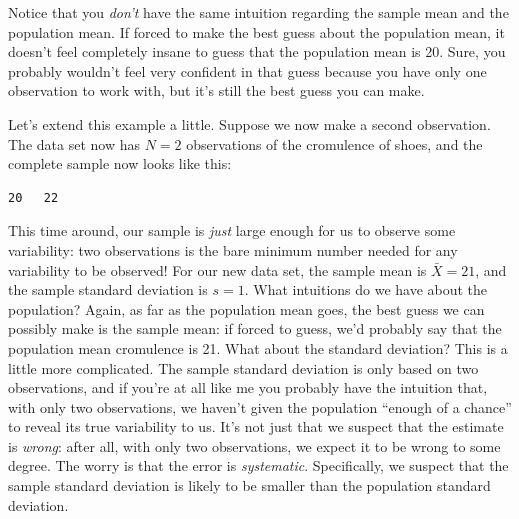 \documentclass[
]{book}
\theoremstyle{definition}
\theoremstyle{definition}
\theoremstyle{definition}
\theoremstyle{definition}
\theoremstyle{remark}
\begin{document}
Notice that you \emph{don't} have the same intuition regarding the sample mean and the population mean. If forced to make the best guess about the population mean, it doesn't feel completely insane to guess that the population mean is 20. Sure, you probably wouldn't feel very confident in that guess because you have only one observation to work with, but it's still the best guess you can make.

Let's extend this example a little. Suppose we now make a second observation. The data set now has \(N=2\) observations of the cromulence of shoes, and the complete sample now looks like this:

\begin{verbatim}
20   22
\end{verbatim}

This time around, our sample is \emph{just} large enough for us to observe some variability: two observations is the bare minimum number needed for any variability to be observed! For our new data set, the sample mean is \(\bar{X}=21\), and the sample standard deviation is \(s=1\). What intuitions do we have about the population? Again, as far as the population mean goes, the best guess we can possibly make is the sample mean: if forced to guess, we'd probably say that the population mean cromulence is 21. What about the standard deviation? This is a little more complicated. The sample standard deviation is only based on two observations, and if you're at all like me you probably have the intuition that, with only two observations, we haven't given the population ``enough of a chance'' to reveal its true variability to us. It's not just that we suspect that the estimate is \emph{wrong}: after all, with only two observations, we expect it to be wrong to some degree. The worry is that the error is \emph{systematic}. Specifically, we suspect that the sample standard deviation is likely to be smaller than the population standard deviation.
\end{document}
